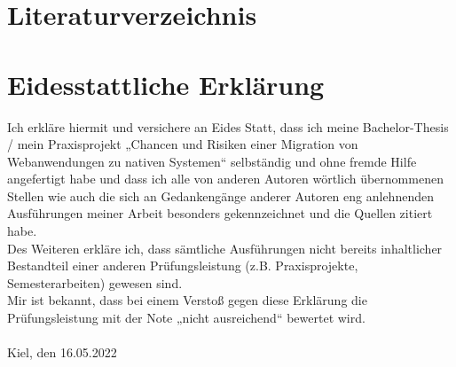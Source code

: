 \documentclass[a4paper]{scrartcl}
\begin{document}

\newpage


\setcounter{page}{6}


\section*{Literaturverzeichnis}

\singlespacing


\printbibliography[heading=none]

\newpage


\section*{Eidesstattliche Erklärung}


\onehalfspacing

Ich erkläre hiermit und versichere an Eides Statt, dass ich meine Bachelor-Thesis / mein Praxisprojekt „Chancen und Risiken einer Migration von Webanwendungen zu nativen Systemen“ selbständig und ohne fremde Hilfe angefertigt habe und dass ich alle von anderen Autoren wörtlich übernommenen Stellen wie auch die sich an Gedankengänge anderer Autoren eng anlehnenden Ausführungen meiner Arbeit besonders gekennzeichnet und die Quellen zitiert habe. \\
Des Weiteren erkläre ich, dass sämtliche Ausführungen nicht bereits inhaltlicher Bestandteil einer anderen Prüfungsleistung (z.B. Praxisprojekte, Semesterarbeiten) gewesen sind. \\
Mir ist bekannt, dass bei einem Verstoß gegen diese Erklärung die Prüfungsleistung mit der Note „nicht ausreichend“ bewertet wird. \\ \\

Kiel, den 16.05.2022 \\ \\ 
\end{document}
